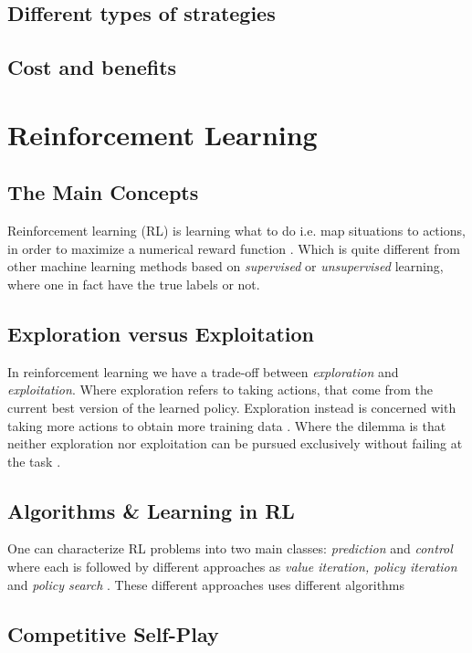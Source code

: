 \documentclass{kththesis}
\theoremstyle{definition}
\begin{document}
\subsection{Different types of strategies}

\subsection{Cost and benefits}

\section{Reinforcement Learning}

\subsection{The Main Concepts}
Reinforcement learning (RL) is learning what to do i.e. map situations to actions, in order to maximize a numerical reward function \parencite{sutton1998reinforcement}. Which is quite different from other machine learning methods based on \textit{supervised} or \textit{unsupervised} learning, where one in fact have the true labels or not.

\subsection{Exploration versus Exploitation}
In reinforcement learning we have a trade-off between \textit{exploration} and \textit{exploitation}. Where exploration refers to taking actions, that come from the current best version of the learned policy. Exploration instead is concerned with taking more actions to obtain more training data \parencite{goodfellow2016deep}. Where the dilemma is that neither exploration nor exploitation can be pursued exclusively without failing at the task \parencite{sutton1998reinforcement}.

\subsection{Algorithms \& Learning in RL}
One can characterize RL problems into two main classes: \textit{prediction} and \textit{control} where each is followed by different approaches as \textit{value iteration, policy iteration} and \textit{policy search} \parencite{szepesvari2009algorithms}. These different approaches uses different algorithms 

\subsection{Competitive Self-Play}
\end{document}
